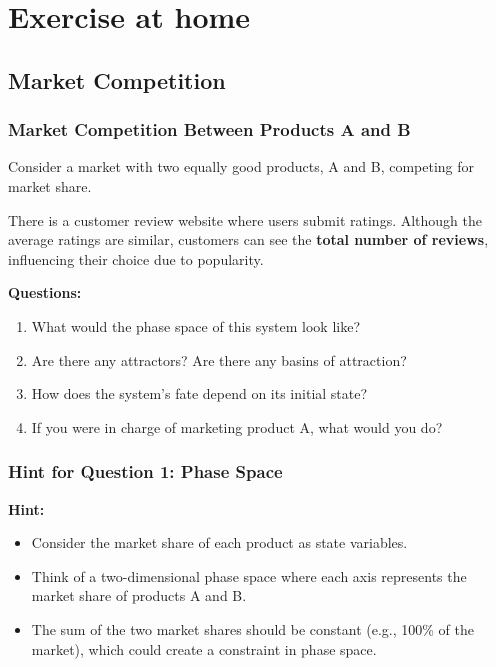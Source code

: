 \documentclass{beamer}
\begin{document}
\section{Exercise at home}
\subsection{Market Competition}
\begin{frame}
    \frametitle{Market Competition Between Products A and B}

    Consider a market with two equally good products, A and B, competing for market share.
    
    \bigskip
    
    There is a customer review website where users submit ratings. Although the average ratings are similar, customers can see the \textbf{total number of reviews}, influencing their choice due to popularity.

    \bigskip

    \textbf{Questions:}
    \begin{enumerate}
        \item What would the phase space of this system look like?
        \item Are there any attractors? Are there any basins of attraction?
        \item How does the system's fate depend on its initial state?
        \item If you were in charge of marketing product A, what would you do?
    \end{enumerate}
\end{frame}

\begin{frame}
    \frametitle{Hint for Question 1: Phase Space}

    \textbf{Hint:}
    \begin{itemize}
        \item Consider the market share of each product as state variables.
        \item Think of a two-dimensional phase space where each axis represents the market share of products A and B.
        \item The sum of the two market shares should be constant (e.g., 100\% of the market), which could create a constraint in phase space.
    \end{itemize}
\end{frame}
\end{document}
